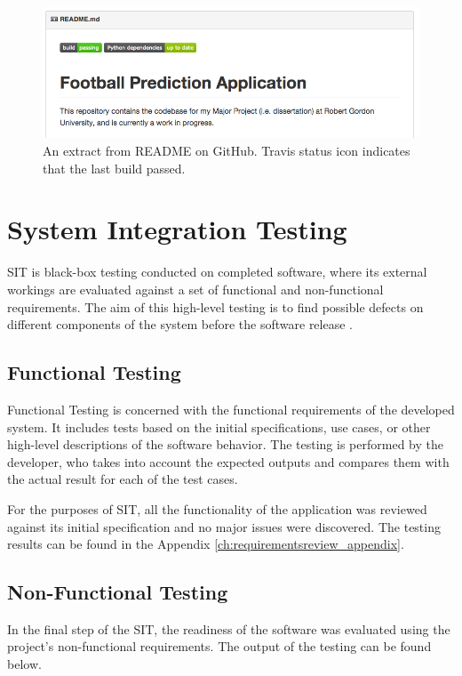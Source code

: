 \begin{figure}[H]
	\begin{center}
		\includegraphics[width=.90\linewidth,natwidth=610,natheight=642]{testing/images/travisBadge}
		\caption{An extract from README on GitHub. Travis status icon indicates that the last build passed.}
		\label{fig:using:travisbadge}
	\end{center}
\end{figure}

\section{System Integration Testing}
\label{sec:systemintegration_test}
SIT is black-box testing conducted on completed software, where its external workings are evaluated against a set of functional and non-functional requirements. The aim of this high-level testing is to find possible defects on different components of the system before the software release \citep{web:testingclass}. 

\subsection*{Functional Testing}
Functional Testing is concerned with the functional requirements of the developed system. It includes tests based on the initial specifications, use cases, or other high-level descriptions of the software behavior. The testing is performed by the developer, who takes into account the expected outputs and compares them with the actual result for each of the test cases.

For the purposes of SIT, all the functionality of the application was reviewed against its initial specification and no major issues were discovered. The testing results can be found in the Appendix \ref{ch:requirementsreview_appendix}.

\subsection*{Non-Functional Testing}
In the final step of the SIT, the readiness of the software was evaluated using the project's non-functional requirements. The output of the testing can be found below. 

